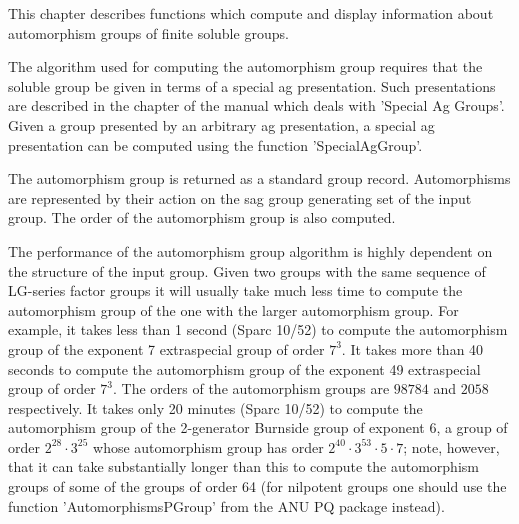 


This chapter describes functions which compute and display information
about automorphism groups of finite soluble groups.


The  algorithm used  for computing  the automorphism  group requires  that the
soluble   group  be  given  in  terms  of  a  special  ag  presentation.  Such
presentations  are described in  the chapter of  the {\GAP} manual which deals
with  'Special  Ag  Groups'.  Given  a  group  presented  by  an  arbitrary ag
presentation,  a special  ag presentation  can be  computed using the function
'SpecialAgGroup'.


The  automorphism  group  is  returned  as  a  standard  {\GAP}  group record.
Automorphisms  are represented by their action on the sag group generating set
of the input group. The order of the automorphism group is also computed.


The performance of the automorphism group algorithm is highly dependent on the
structure  of the  input group.  Given two  groups with  the same  sequence of
LG-series  factor groups it  will usually take  much less time  to compute the
automorphism group of the one with the larger automorphism group. For example,
it takes less than 1 second (Sparc 10/52) to compute the automorphism group of
the  exponent  7  extraspecial  group  of  order  $7^3$. It takes more than 40
seconds  to compute  the automorphism  group of  the exponent  49 extraspecial
group  of order $7^3$. The  orders of the automorphism  groups are $98784$ and
$2058$  respectively.   It takes only 20  minutes (Sparc 10/52) to compute the
automorphism group of the 2-generator Burnside group of exponent 6, a group of
order  $2^{28}\cdot 3^{25}$  whose automorphism  group has  order $2^{40}\cdot
3^{53}\cdot  5\cdot 7$; note,  however, that it  can take substantially longer
than this to compute the automorphism groups of some of the groups of order 64
(for  nilpotent groups one should  use the function 'AutomorphismsPGroup' from
the ANU PQ package instead).


